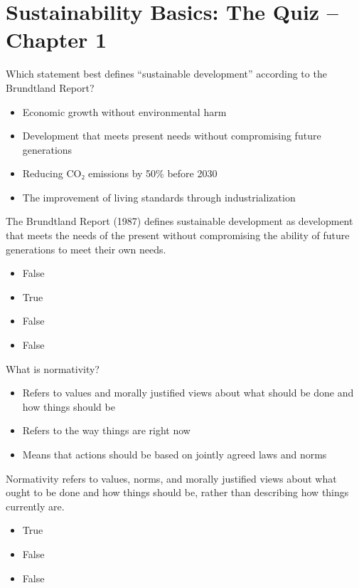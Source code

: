 \documentclass[
  a4paper,
  DIV=11,
  numbers=noendperiod,
  oneside,
  openany]{scrreprt}
\providecommand{\tightlist}{%
  \setlength{\itemsep}{0pt}\setlength{\parskip}{0pt}}
\begin{document}
\section{Sustainability Basics: The Quiz -- Chapter
1}\label{sustainability-basics-the-quiz-chapter-1}

Which statement best defines ``sustainable development'' according to
the Brundtland Report?

\begin{itemize}
\tightlist
\item[$\square$]
  Economic growth without environmental harm
\item[$\square$]
  Development that meets present needs without compromising future
  generations
\item[$\square$]
  Reducing CO₂ emissions by 50\% before 2030
\item[$\square$]
  The improvement of living standards through industrialization
\end{itemize}

The Brundtland Report (1987) defines sustainable development as
development that meets the needs of the present without compromising the
ability of future generations to meet their own needs.

\begin{itemize}
\tightlist
\item
  False
\item
  True
\item
  False
\item
  False
\end{itemize}

What is normativity?

\begin{itemize}
\tightlist
\item[$\square$]
  Refers to values and morally justified views about what should be done
  and how things should be
\item[$\square$]
  Refers to the way things are right now
\item[$\square$]
  Means that actions should be based on jointly agreed laws and norms
\end{itemize}

Normativity refers to values, norms, and morally justified views about
what ought to be done and how things should be, rather than describing
how things currently are.

\begin{itemize}
\tightlist
\item
  True
\item
  False
\item
  False
\end{itemize}
\end{document}
